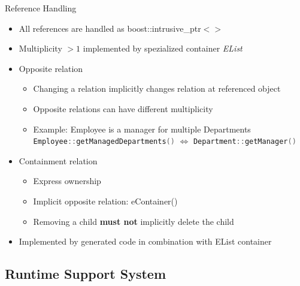 \documentclass[pdf, 10pt]{beamer}
\begin{document}
\begin{frame}{Reference Handling}
  \begin{itemize}
  \item<1-> All references are handled as boost::intrusive\_ptr$<>$
  \item<1-> Multiplicity $>1$ implemented by spezialized container {\em EList}
  \item<1-> Opposite relation
    \begin{itemize}
    \item<2-> Changing a relation implicitly changes relation at referenced object
    \item<2-> Opposite relations can have different multiplicity
    \item<2-> Example: Employee is a manager for multiple Departments\\
      \lstinline[language=C++,basicstyle=\ttfamily,keywordstyle=\color{blue}]{Employee::getManagedDepartments()}
$\iff$
\lstinline[language=C++,basicstyle=\ttfamily,keywordstyle=\color{blue}]{Department::getManager()}
    \end{itemize}
  \item<1-> Containment relation
    \begin{itemize}
    \item<3-> Express ownership
    \item<3-> Implicit opposite relation: eContainer()
    \item<3-> Removing a child \textbf{must not} implicitly delete the child
    \end{itemize}
  \item<4-> Implemented by generated code in combination with EList container
  \end{itemize}
\end{frame}

\subsection{Runtime Support System}
\end{document}
